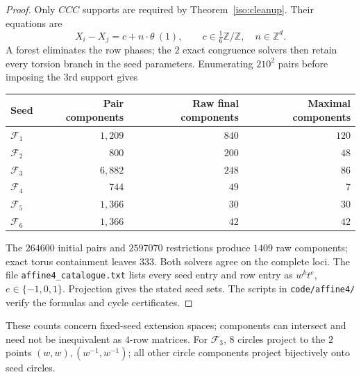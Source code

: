 \documentclass[11pt,a4paper]{article}
\theoremstyle{plain}
\theoremstyle{definition}
\numberwithin{equation}{section}
\begin{document}
\begin{proof}
Only $CCC$ supports are required by Theorem~\ref{iso:cleanup}. Their equations are
$$
X_i-X_j=c+n\cdot\theta\ (1),\qquad
c\in\tfrac16\mathbb Z/\mathbb Z,\quad n\in\mathbb Z^d.
$$
A forest eliminates the row phases; the $2$ exact congruence solvers then retain every torsion branch in the seed parameters. Enumerating $210^2$ pairs before imposing the $3$rd support gives
\begin{center}\begin{tabular}{@{}lrrr@{}}\toprule
Seed & Pair components & Raw final components & Maximal components\\\midrule
$\mathcal{F}_1$&$1{,}209$&$840$&$120$\\
$\mathcal{F}_2$&$800$&$200$&$48$\\
$\mathcal{F}_3$&$6{,}882$&$248$&$86$\\
$\mathcal{F}_4$&$744$&$49$&$7$\\
$\mathcal{F}_5$&$1{,}366$&$30$&$30$\\
$\mathcal{F}_6$&$1{,}366$&$42$&$42$\\\bottomrule
\end{tabular}\end{center}
The $264600$ initial pairs and $2597070$ restrictions produce $1409$ raw components; exact torus containment leaves $333$. Both solvers agree on the complete loci. The file \texttt{affine4\_catalogue.txt} lists every seed entry and row entry as $w^k t^e$, $e\in\{-1,0,1\}$. Projection gives the stated seed sets. The scripts in \texttt{code/affine4/} verify the formulas and cycle certificates.
\end{proof}
These counts concern fixed-seed extension spaces; components can intersect and need not be inequivalent as $4$-row matrices. For $\mathcal F_3$, $8$ circles project to the $2$ points $(w,w),(w^{-1},w^{-1})$; all other circle components project bijectively onto seed circles.
\end{document}
